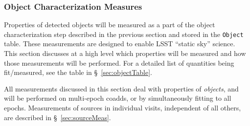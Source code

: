 \documentclass[12pt]{article}
\newcommand{\code}[1]{\texttt{#1}}
\newcommand{\Object}{\code{Object}\xspace}
\begin{document}
\subsubsection{Object Characterization Measures}
\label{sec:objchar}

Properties of detected objects will be measured as a part of the object characterization step described in the previous section and stored in the \Object table. These measurements are designed to enable LSST ``static sky'' science. This section discusses at a high level which properties will be measured and how those measurements will be performed. For a detailed list of quantities being fit/measured, see the table in \S~\ref{sec:objectTable}.

All measurements discussed in this section deal with properties of \emph{objects}, and will be performed on multi-epoch coadds, or by simultaneously fitting to all epochs. Measurements of sources in individual visits, independent of all others, are described in \S~\ref{sec:sourceMeas}.

\vspace{1em}
\end{document}
